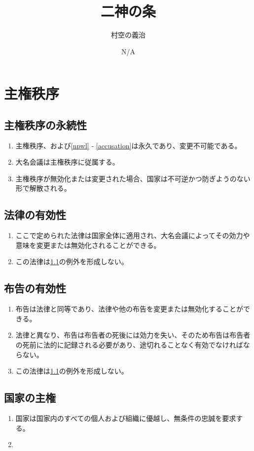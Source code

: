 \documentclass{article}
\title{二神の条}
\author{村空の義治}
\date{N/A}
\begin{document}
\maketitle\newpage
\section{主権秩序}
\subsection{主権秩序の永続性}\label{permanency}
\begin{enumerate}
    \item 主権秩序、および\ref{npwl} - \ref{accusation}は永久であり、変更不可能である。
    \item 大名会議は主権秩序に従属する。
    \item 主権秩序が無効化または変更された場合、国家は不可逆かつ防ぎようのない形で解散される。
\end{enumerate}

\subsection{法律の有効性}
\begin{enumerate}
    \item ここで定められた法律は国家全体に適用され、大名会議によってその効力や意味を変更または無効化されることができる。
    \item この法律は\ref{permanency}の例外を形成しない。
\end{enumerate}

\subsection{布告の有効性}
\begin{enumerate}
    \item 布告は法律と同等であり、法律や他の布告を変更または無効化することができる。
    \item 法律と異なり、布告は布告者の死後には効力を失い、そのため布告は布告者の死前に法的に記録される必要があり、途切れることなく有効でなければならない。
    \item この法律は\ref{permanency}の例外を形成しない。
\end{enumerate}

\subsection{国家の主権}
\begin{enumerate}
    \item 国家は国家内のすべての個人および組織に優越し、無条件の忠誠を要求する。
    \item 
\end{enumerate}
\end{document}
